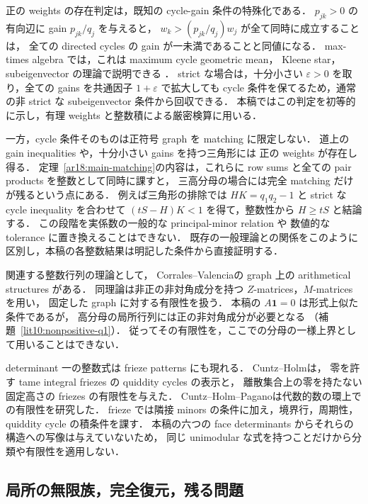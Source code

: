 正の weights の存在判定は，既知の cycle-gain 条件の特殊化である．
$p_{jk}>0$ の有向辺に gain $p_{jk}/q_j$ を与えると，
$w_k>(p_{jk}/q_j)w_j$ が全て同時に成立することは，
全ての directed cycles の gain が一未満であることと同値になる．
max-times algebra では，これは maximum cycle geometric mean，
Kleene star，subeigenvector の理論で説明できる
\cite[\S2, Theorem~2.2 and Proposition~2.5]{SergeevSchneiderButkovic}．
strict な場合は，十分小さい $\varepsilon>0$ を取り，全ての gains を共通因子 $1+\varepsilon$ で拡大しても
cycle 条件を保てるため，通常の非 strict な subeigenvector 条件から回収できる．
本稿ではこの判定を初等的に示し，有理 weights と整数積による厳密検算に用いる．

一方，cycle 条件そのものは正符号 graph を matching に限定しない．
道上の gain inequalities や，十分小さい gains を持つ三角形には
正の weights が存在し得る．
定理~\ref{ar18:main-matching}の内容は，これらに
row sums と全ての pair products を整数として同時に課すと，
三高分母の場合には完全 matching だけが残るという点にある．
例えば三角形の排除では $HK=q_1q_2-1$ と strict な cycle inequality を合わせて
$(tS-H)K<1$ を得て，整数性から $H\ge tS$ と結論する．
この段階を実係数の一般的な principal-minor relation や
数値的な tolerance に置き換えることはできない．
既存の一般理論との関係をこのように区別し，本稿の各整数結果は明記した条件から直接証明する．

関連する整数行列の理論として，
Corrales--Valencia\cite[\S\S2--3]{CorralesValencia}の graph 上の arithmetical structures がある．
同理論は非正の非対角成分を持つ $Z$-matrices，$M$-matrices を用い，
固定した graph に対する有限性を扱う．
本稿の $A\mathbf1=0$ は形式上似た条件であるが，
高分母の局所行列には正の非対角成分が必要となる
（補題~\ref{lit10:nonpositive-q1}）．
従ってその有限性を，ここでの分母の一様上界として用いることはできない．

determinant 一の整数式は frieze patterns にも現れる．
Cuntz--Holm\cite[\S\S2--3 and~7]{CuntzHolmFriezes}は，
零を許す tame integral friezes の quiddity cycles の表示と，
離散集合上の零を持たない固定高さの friezes の有限性を与えた．
Cuntz--Holm--Pagano\cite{CuntzHolmPagano}は代数的数の環上での有限性を研究した．
frieze では隣接 minors の条件に加え，境界行，周期性，quiddity cycle の積条件を課す．
本稿の六つの face determinants からそれらの構造への写像は与えていないため，
同じ unimodular な式を持つことだけから分類や有限性を適用しない．

\subsection{局所の無限族，完全復元，残る問題}

